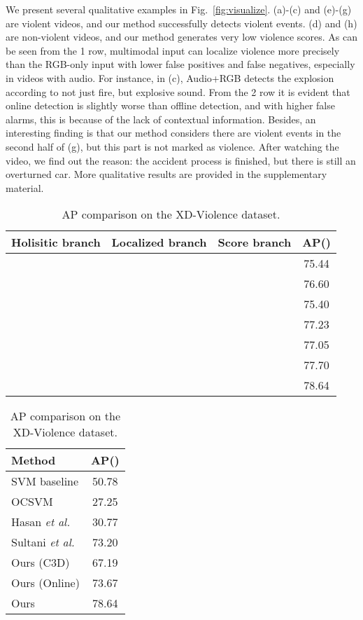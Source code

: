 \documentclass[runningheads]{llncs}
\begin{document}
We present several qualitative examples in Fig.~\ref{fig:visualize}. (a)-(c) and (e)-(g) are violent videos, and our method successfully detects violent events. (d) and (h) are non-violent videos, and our method generates very low violence scores. As can be seen from the 1 row, multimodal input can localize violence more precisely than the RGB-only input with lower false positives and false negatives, especially in videos with audio. For instance, in (c), Audio+RGB detects the explosion according to not just fire, but explosive sound. From the 2 row it is evident that online detection is slightly worse than offline detection, and with higher false alarms, this is because of the lack of contextual information. Besides, an interesting finding is that our method considers there are violent events in the second half of (g), but this part is not marked as violence. After watching the video, we find out the reason: the accident process is finished, but there is still an overturned car. More qualitative results are provided in the supplementary material.

\begin{table}[t]
\begin{minipage}[t]{0.6\textwidth}
  \centering
     \makeatletter{}\makeatother\caption{AP comparison of different branches.}\label{table:branch}
    \begin{tabular}{p{1.2cm}<{\centering}p{1.3cm}<{\centering}p{1.2cm}<{\centering}|c}
	\hline
Holisitic branch  & Localized branch & Score branch & AP() \\
\hline
  &  &  & 75.44 \\
	  &  &  & 76.60 \\
	  &  &  & 75.40 \\
	\hline \hline
	  &  &  & 77.23 \\
	  &  &  & 77.05 \\
	  &  &  & 77.70 \\
	\hline \hline
	 &  &  & 78.64 \\
	\hline
    \end{tabular}
  \end{minipage}
  \begin{minipage}[t]{0.4\textwidth}
   \centering
        \makeatletter{}\makeatother\caption{AP comparison on the XD-Violence dataset.
}\label{table:sota}		
          \begin{tabular}{l|c}
		\hline
Method  & AP() \\
\hline
SVM baseline  & 50.78 \\
		OCSVM \cite{scholkopf2000support}    & 27.25 \\
		Hasan \textit{et al.} \cite{hasan2016learning}  & 30.77 \\
		Sultani \textit{et al.} \cite{sultani2018real} & 73.20 \\
		\hline \hline
		Ours (C3D)    & 67.19 \\
		Ours (Online)  & 73.67 \\		
		Ours   & 78.64 \\
		\hline
      \end{tabular}
   \end{minipage}
\end{table}
\setlength{\tabcolsep}{1.4pt}
\end{document}
